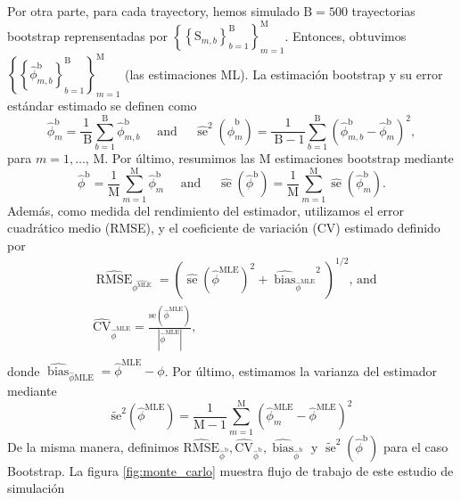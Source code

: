 Por otra parte, para cada trayectory, hemos simulado $\mathrm{B}=500$ trayectorias bootstrap reprensentadas por $\left\{\left\{\mathrm{S}_{m, b}\right\}_{b=1}^{\mathrm{B}}\right\}_{m=1}^{\mathrm{M}}$. Entonces, obtuvimos $\left\{\left\{\hat{\phi}_{m, b}^{\mathrm{b}}\right\}_{b=1}^{\mathrm{B}}\right\}_{m=1}^{\mathrm{M}}$ 
(las estimaciones ML). La estimación bootstrap y su error estándar estimado se definen como
$$
\hat{\phi}_m^{\mathrm{b}}=\frac{1}{\mathrm{~B}} \sum_{b=1}^{\mathrm{B}} \hat{\phi}_{m, b}^{\mathrm{b}} \quad \text { and } \quad \widehat{\operatorname{se}}^2\left(\hat{\phi}_m^{\mathrm{b}}\right)=\frac{1}{\mathrm{~B}-1} \sum_{b=1}^{\mathrm{B}}\left(\hat{\phi}_{m, b}^{\mathrm{b}}-\hat{\phi}_m^{\mathrm{b}}\right)^2,
$$
para $m=1, \ldots$, M. Por último, resumimos las M estimaciones bootstrap mediante
$$
\hat{\phi}^{\mathrm{b}}=\frac{1}{\mathrm{M}} \sum_{m=1}^{\mathrm{M}} \hat{\phi}_m^{\mathrm{b}} \quad \text { and } \quad \widehat{\operatorname{se}}\left(\hat{\phi}^{\mathrm{b}}\right)=\frac{1}{\mathrm{M}} \sum_{m=1}^{\mathrm{M}} \widehat{\operatorname{se}}\left(\hat{\phi}_m^{\mathrm{b}}\right) .
$$
Además, como medida del rendimiento del estimador, utilizamos el error cuadrático medio (RMSE), y el coeficiente de variación (CV) estimado definido por
$$
\begin{aligned}
& \widehat{\operatorname{RMSE}}_{\hat{\phi^{\mathrm{MLE}}}}=\left(\widehat{\operatorname{se}}\left(\hat{\phi}^{\mathrm{MLE}}\right)^2+{\widehat{\operatorname{bias}}_{{\hat{\phi}}^{\mathrm{MLE}}}}^2\right)^{1 / 2} \text {, and } \\
& \widehat{\mathrm{CV}}_{\hat{\phi}^{\mathrm{MLE}}}=\frac{\widehat{\mathrm{se}}\left(\hat{\phi}^{\mathrm{MLE}}\right)}{\left|\hat{\phi}^{\mathrm{MLE}}\right|}, \\
&
\end{aligned}
$$
donde $\widehat{\operatorname{bias}}_{\hat{\phi} \mathrm{MLE}}=\hat{\phi}^{\mathrm{MLE}}-\phi$. Por último, estimamos la varianza del estimador mediante
$$
\widetilde{\mathrm{se}}^2\left(\hat{\phi}^{\mathrm{MLE}}\right)=\frac{1}{\mathrm{M}-1} \sum_{m=1}^{\mathrm{M}}\left(\hat{\phi}_m^{\mathrm{MLE}}-\hat{\phi}^{\mathrm{MLE}}\right)^2
$$
De la misma manera, definimos $\widehat{\mathrm{RMSE}}_{\hat{\phi}^{\mathrm{b}}}, \widehat{\mathrm{CV}}_{\hat{\phi}^{\mathrm{b}}}, \widehat{\operatorname{bias}}_{\hat{\phi}^{\mathrm{b}}}$ y $\widetilde{\operatorname{se}}^2\left(\hat{\phi}^{\mathrm{b}}\right)$ para el caso Bootstrap. La figura \ref{fig:monte_carlo} muestra flujo de trabajo de este estudio de simulación

